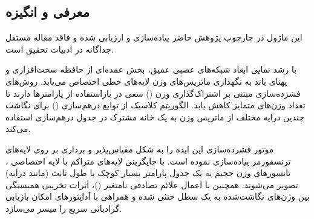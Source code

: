 \subsection{معرفی و انگیزه}
این ماژول در چارچوب پژوهش حاضر پیاده‌سازی و ارزیابی شده و فاقد مقاله مستقل جداگانه در ادبیات تحقیق است.

با رشد نمایی ابعاد شبکه‌های عصبی عمیق، بخش عمده‌ای از حافظه سخت‌افزاری و پهنای باند به نگهداری ماتریس‌های وزن لایه‌های خطی اختصاص می‌یابد. روش‌های فشرده‌سازی مبتنی بر اشتراک‌گذاری وزن () سعی در بازاستفاده از پارامترها دارند تا تعداد وزن‌های متمایز کاهش یابد. الگوریتم کلاسیک  از توابع درهم‌سازی () برای نگاشت چندین درایه مختلف از ماتریس وزن به یک خانه مشترک در جدول درهم‌سازی استفاده می‌کند.

موتور فشرده‌سازی  این ایده را به شکل مقیاس‌پذیر و برداری بر روی لایه‌های ترنسفورمر پیاده‌سازی نموده است. با جایگزینی لایه‌های متراکم با لایه اختصاصی ، تانسورهای وزن حجیم به یک جدول پارامتر بسیار کوچک با طول ثابت (مانند  درایه) تصویر می‌شوند. همچنین با اعمال علائم تصادفی نامتغیر ()، اثرات تخریبی همبستگی بین وزن‌های نگاشت‌شده به یک سطل خنثی شده و همراهی با آداپتورهای  امکان بازیابی گرادیانی سریع را میسر می‌سازد.
